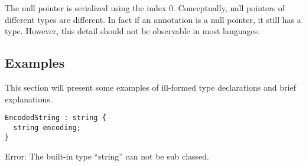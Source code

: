 The null pointer is serialized using the index 0. Conceptually, null pointers of different types are different. In fact if an annotation is a null pointer, it still has a type. However, this detail should not be observable in most languages.


\subsection{Examples}

This section will present some examples of ill-formed type declarations and brief explanations.

\begin{lstlisting}[label=stringExample,caption=Legal Super Types,language=skill]
EncodedString : string {
  string encoding;
}
\end{lstlisting}
Error: The built-in type ``string'' can not be sub classed.
